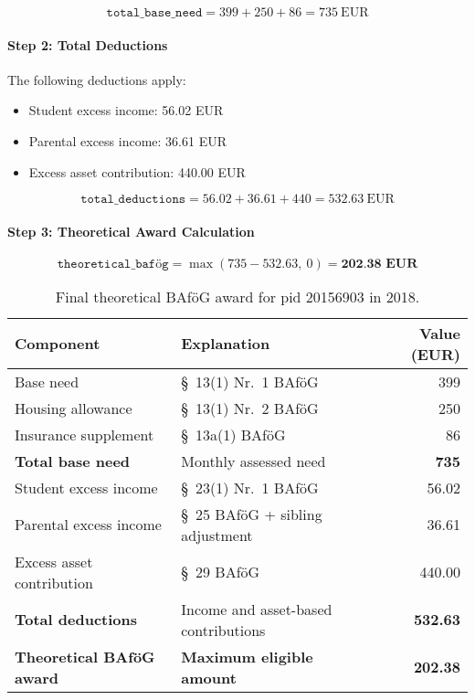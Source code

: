 \[
\texttt{total\_base\_need} = 399 + 250 + 86 = 735~\text{EUR}
\]

\paragraph{Step 2: Total Deductions}

The following deductions apply:
\begin{itemize}
    \item Student excess income: 56.02 EUR
    \item Parental excess income: 36.61 EUR
    \item Excess asset contribution: 440.00 EUR
\end{itemize}

\[
\texttt{total\_deductions} = 56.02 + 36.61 + 440 = 532.63~\text{EUR}
\]

\paragraph{Step 3: Theoretical Award Calculation}

\[
\texttt{theoretical\_bafög} = \max(735 - 532.63,\ 0) = \textbf{202.38~EUR}
\]

\begin{table}[H]
\footnotesize
\centering
\begin{tabularx}{\textwidth}{lXr}
\toprule
\textbf{Component} & \textbf{Explanation} & \textbf{Value (EUR)} \\
\midrule
Base need & §~13(1) Nr.~1 BAföG & 399 \\
Housing allowance & §~13(1) Nr.~2 BAföG & 250 \\
Insurance supplement & §~13a(1) BAföG & 86 \\
\midrule
\textbf{Total base need} & Monthly assessed need & \textbf{735} \\
\midrule
Student excess income & §~23(1) Nr.~1 BAföG & 56.02 \\
Parental excess income & §~25 BAföG + sibling adjustment & 36.61 \\
Excess asset contribution & §~29 BAföG & 440.00 \\
\midrule
\textbf{Total deductions} & Income and asset-based contributions & \textbf{532.63} \\
\midrule
\textbf{Theoretical BAföG award} & \textbf{Maximum eligible amount} & \textbf{202.38} \\
\bottomrule
\end{tabularx}
\caption{Final theoretical BAföG award for pid 20156903 in 2018.}
\label{table:bafoeg_final_award}
\end{table}

